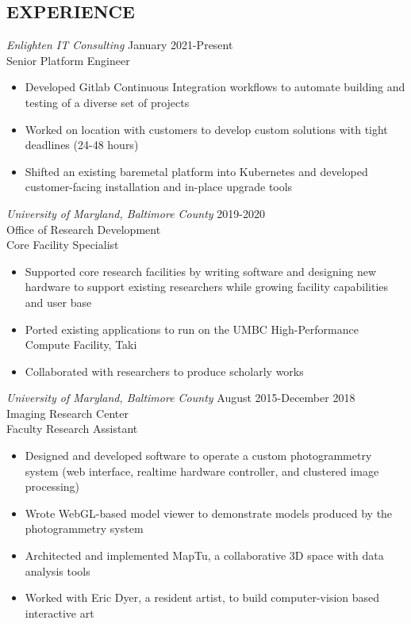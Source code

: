 \documentclass[line]{resume}
\begin{document}
\begin{resume}
\section{EXPERIENCE}
  {\sl Enlighten IT Consulting} \hfill January 2021-Present \\
    Senior Platform Engineer
    \begin{itemize}
        \item Developed Gitlab Continuous Integration workflows to automate building and testing of a diverse set of projects
        \item Worked on location with customers to develop custom solutions with tight deadlines (24-48 hours)
        \item Shifted an existing baremetal platform into Kubernetes and developed customer-facing installation and in-place upgrade tools
    \end{itemize}
  {\sl University of Maryland, Baltimore County} \hfill 2019-2020 \\
    Office of Research Development \\
    Core Facility Specialist
    \begin{itemize}
        \item Supported core research facilities by writing software and designing new hardware to support existing researchers while growing facility capabilities and user base
        \item Ported existing applications to run on the UMBC High-Performance Compute Facility, Taki
        \item Collaborated with researchers to produce scholarly works
    \end{itemize}
  {\sl University of Maryland, Baltimore County} \hfill August 2015-December 2018 \\
    Imaging Research Center \\
    Faculty Research Assistant
    \begin{itemize}
      \item Designed and developed software to operate a custom photogrammetry system (web interface, realtime hardware controller, and clustered image processing)
      \item Wrote WebGL-based model viewer to demonstrate models produced by the photogrammetry system
      \item Architected and implemented MapTu, a collaborative 3D space with data analysis tools
      \item Worked with Eric Dyer, a resident artist, to build computer-vision based interactive art

\end{itemize}
\end{resume}
\end{document}
